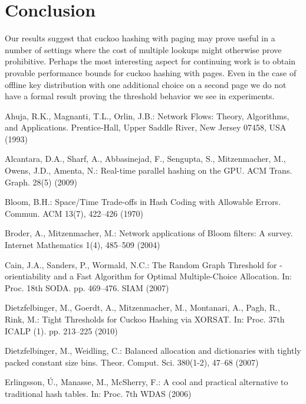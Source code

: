 \let\accentvec\vec \documentclass{llncs}
\begin{document}
\section{Conclusion}
Our results suggest that cuckoo hashing with paging may prove useful in a number of settings where the cost of multiple lookups might otherwise prove prohibitive. Perhaps the most interesting aspect for continuing work is to obtain
provable performance bounds for cuckoo hashing with pages.  Even in
the case of offline key distribution with one additional choice on a
second page we do not have a formal result proving the threshold
behavior we see in experiments.     

\begin{thebibliography}{10}
\providecommand{\url}[1]{\texttt{#1}}
\providecommand{\urlprefix}{URL }

Ahuja, R.K., Magnanti, T.L., Orlin, J.B.: {Network Flows: Theory, Algorithms,
  and Applications}. Prentice-Hall, Upper Saddle River, New Jersey 07458, USA
  (1993)

Alcantara, D.A., Sharf, A., Abbasinejad, F., Sengupta, S., Mitzenmacher, M.,
  Owens, J.D., Amenta, N.: {Real-time parallel hashing on the GPU}. ACM Trans.
  Graph.  28(5) (2009)

Bloom, B.H.: {Space/Time Trade-offs in Hash Coding with Allowable Errors}.
  Commun. ACM  13(7),  422--426 (1970)

Broder, A., Mitzenmacher, M.: {Network applications of Bloom filters: A
  survey}. Internet Mathematics  1(4),  485--509 (2004)

Cain, J.A., Sanders, P., Wormald, N.C.: {The Random Graph Threshold for
  -orientiability and a Fast Algorithm for Optimal Multiple-Choice
  Allocation}. In: Proc. 18th SODA. pp. 469--476. SIAM (2007)

Dietzfelbinger, M., Goerdt, A., Mitzenmacher, M., Montanari, A., Pagh, R.,
  Rink, M.: {Tight Thresholds for Cuckoo Hashing via XORSAT}. In: Proc. 37th
  ICALP (1). pp. 213--225 (2010)

Dietzfelbinger, M., Weidling, C.: {Balanced allocation and dictionaries with
  tightly packed constant size bins}. Theor. Comput. Sci.  380(1-2),  47--68
  (2007)

Erlingsson, {\'U}., Manasse, M., McSherry, F.: {A cool and practical
  alternative to traditional hash tables}. In: Proc. 7th WDAS (2006)


\end{thebibliography}
\end{document}
